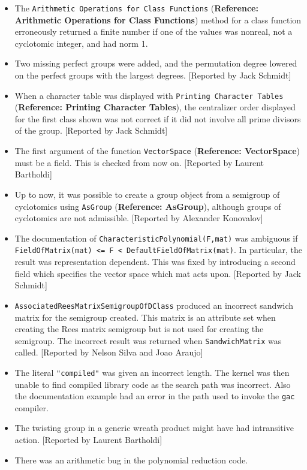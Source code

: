 \documentclass[a4paper,11pt]{report}
\begin{document}
{{\begin{itemize}
\item  The \texttt{Arithmetic Operations for Class Functions} (\textbf{Reference: Arithmetic Operations for Class Functions}) method for a class function erroneously returned a finite number if one of the
values was nonreal, not a cyclotomic integer, and had norm 1. 
\item  Two missing perfect groups were added, and the permutation degree lowered on
the perfect groups with the largest degrees. [Reported by Jack Schmidt] 
\item  When a character table was displayed with \texttt{Printing Character Tables} (\textbf{Reference: Printing Character Tables}), the centralizer order displayed for the first class shown was not correct if
it did not involve all prime divisors of the group. [Reported by Jack Schmidt] 
\item  The first argument of the function \texttt{VectorSpace} (\textbf{Reference: VectorSpace}) must be a field. This is checked from now on. [Reported by Laurent Bartholdi] 
\item  Up to now, it was possible to create a group object from a semigroup of
cyclotomics using \texttt{AsGroup} (\textbf{Reference: AsGroup}), although groups of cyclotomics are not admissible. [Reported by Alexander
Konovalov] 
\item  The documentation of \texttt{CharacteristicPolynomial(F,mat)} was ambiguous if \texttt{FieldOfMatrix(mat) {\textless}= F {\textless} DefaultFieldOfMatrix(mat)}. In particular, the result was representation dependent. This was fixed by
introducing a second field which specifies the vector space which mat acts
upon. [Reported by Jack Schmidt] 
\item  \texttt{AssociatedReesMatrixSemigroupOfDClass} produced an incorrect sandwich matrix for the semigroup created. This matrix
is an attribute set when creating the Rees matrix semigroup but is not used
for creating the semigroup. The incorrect result was returned when \texttt{SandwichMatrix} was called. [Reported by Nelson Silva and Joao Araujo] 
\item  The literal \texttt{"compiled"} was given an incorrect length. The kernel was then unable to find compiled
library code as the search path was incorrect. Also the documentation example
had an error in the path used to invoke the \texttt{gac} compiler. 
\item  The twisting group in a generic wreath product might have had intransitive
action. [Reported by Laurent Bartholdi] 
\item  There was an arithmetic bug in the polynomial reduction code. 

\end{itemize}}}
\end{document}
